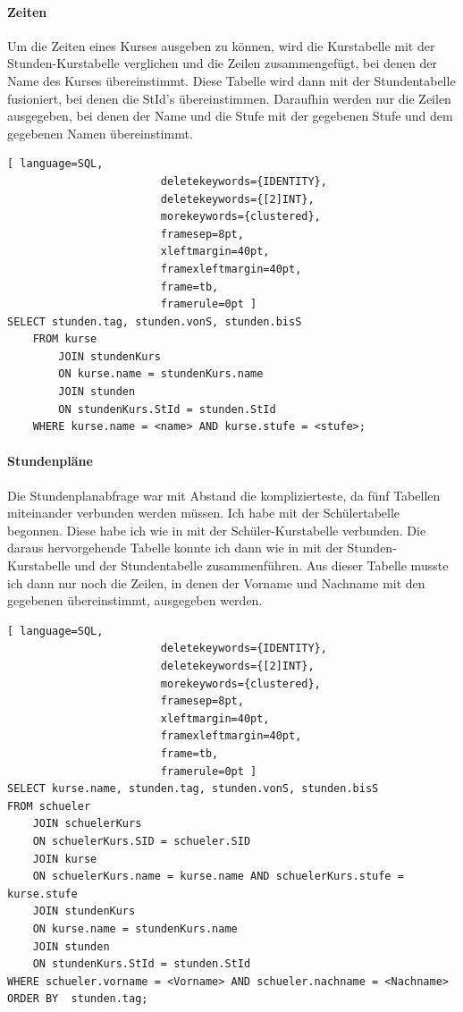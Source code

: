 \documentclass[a4paper, 12pt]{article}
\theoremstyle{plain}
\theoremstyle{definition}
\begin{document}
	\paragraph{Zeiten} \label{sec:selZeit}
	Um die Zeiten eines Kurses ausgeben zu können, wird die Kurstabelle mit der Stunden-Kurstabelle verglichen und die Zeilen zusammengefügt, bei denen der Name des Kurses übereinstimmt. Diese Tabelle wird dann mit der Stundentabelle fusioniert, bei denen die StId's übereinstimmen. Daraufhin werden nur die Zeilen ausgegeben, bei denen der Name und die Stufe mit der gegebenen Stufe und dem gegebenen Namen übereinstimmt.
	\begin{lstlisting}[ language=SQL,
	                    deletekeywords={IDENTITY},
	                    deletekeywords={[2]INT},
	                    morekeywords={clustered},
	                    framesep=8pt,
	                    xleftmargin=40pt,
	                    framexleftmargin=40pt,
	                    frame=tb,
	                    framerule=0pt ]	
SELECT stunden.tag, stunden.vonS, stunden.bisS
    FROM kurse
        JOIN stundenKurs
        ON kurse.name = stundenKurs.name
        JOIN stunden
        ON stundenKurs.StId = stunden.StId
    WHERE kurse.name = <name> AND kurse.stufe = <stufe>;\end{lstlisting}	
	
	\paragraph{Stundenpläne} Die Stundenplanabfrage war mit Abstand die komplizierteste, da fünf Tabellen miteinander verbunden werden müssen. Ich habe mit der Schülertabelle begonnen. Diese habe ich wie in  mit der Schüler-Kurstabelle verbunden. Die daraus hervorgehende Tabelle konnte ich dann wie in  mit der Stunden-Kurstabelle und der Stundentabelle zusammenführen. Aus dieser Tabelle musste ich dann nur noch die Zeilen, in denen der Vorname und Nachname mit den gegebenen übereinstimmt, ausgegeben werden.
	\begin{lstlisting}[ language=SQL,
	                    deletekeywords={IDENTITY},
	                    deletekeywords={[2]INT},
	                    morekeywords={clustered},
	                    framesep=8pt,
	                    xleftmargin=40pt,
	                    framexleftmargin=40pt,
	                    frame=tb,
	                    framerule=0pt ]	
SELECT kurse.name, stunden.tag, stunden.vonS, stunden.bisS
FROM schueler 
    JOIN schuelerKurs
    ON schuelerKurs.SID = schueler.SID
    JOIN kurse 
    ON schuelerKurs.name = kurse.name AND schuelerKurs.stufe = kurse.stufe
    JOIN stundenKurs
    ON kurse.name = stundenKurs.name
    JOIN stunden
    ON stundenKurs.StId = stunden.StId
WHERE schueler.vorname = <Vorname> AND schueler.nachname = <Nachname> ORDER BY  stunden.tag; \end{lstlisting}	
\end{document}
